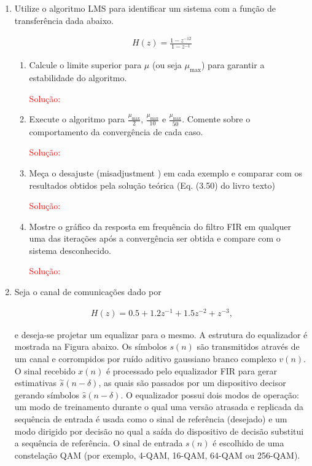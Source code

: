 \documentclass[a4paper,10pt]{article}
\begin{document}
\begin{enumerate}
\begin{enumerate}
				\end{enumerate}
			
			\item Utilize o algoritmo LMS para identiﬁcar um sistema com a função de transferência dada abaixo.
			
				\begin{align}
					H(z) = \frac{1 - z^{-12}}{1 - z^{-1}}
				\end{align}
			
				\begin{enumerate}
					
					\item Calcule o limite superior para $\mu$ (ou seja $\mu_{\text{max}}$) para garantir a estabilidade do algoritmo.
					
						\textcolor{red}{Solução:}
					
					\item Execute o algoritmo para $\frac{\mu_{\text{max}}}{2}$, $\frac{\mu_{\text{max}}}{10}$ e $\frac{\mu_{\text{max}}}{50}$. Comente sobre o comportamento da convergência de cada caso.
						
						\textcolor{red}{Solução:}

					\item Meça o desajuste (misadjustment ) em cada exemplo e comparar com os resultados obtidos pela solução teórica (Eq. (3.50) do livro texto)					

						\textcolor{red}{Solução:}

					\item Mostre o gráﬁco da resposta em frequência do ﬁltro FIR em qualquer uma das iterações após a convergência ser obtida e compare com o sistema desconhecido.
					
						\textcolor{red}{Solução:}

				\end{enumerate}
			
			\item Seja o canal de comunicações dado por
			
				\begin{align}
					H(z) = 0.5 + 1.2z^{-1} + 1.5z^{-2} + z^{-3},
				\end{align}
				
				e deseja-se projetar um equalizar para o mesmo. A estrutura do equalizador é mostrada na Figura abaixo. Os símbolos $s(n)$ são transmitidos através de um canal e corrompidos por ruído aditivo gaussiano branco complexo $v(n)$. O sinal recebido $x(n)$ é processado pelo equalizador FIR para gerar estimativas $\overset{\sim}{s}(n - \delta)$, as quais são passados por um dispositivo decisor gerando  símbolos $\hat{s}(n - \delta)$. O equalizador possui dois modos de operação: um modo de treinamento durante o qual uma versão atrasada e  replicada da sequência de entrada é usada como o sinal de referência (desejado) e um modo dirigido por decisão no qual a saída do dispositivo de decisão substitui a sequência de referência. O sinal de entrada $s(n)$ é escolhido de uma constelação QAM (por exemplo, 4-QAM, 16-QAM, 64-QAM ou 256-QAM).
				

\end{enumerate}
\end{document}
